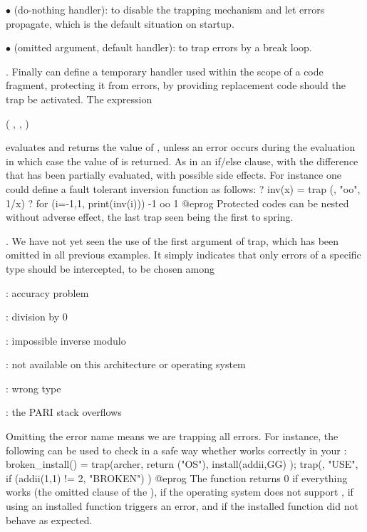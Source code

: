 $\bullet$  (do-nothing handler): to disable the trapping
mechanism and let errors propagate, which is the default situation on
startup.

$\bullet$   (omitted argument, default handler): to trap errors
by a break loop.

. Finally  can define a temporary handler
used within the scope of a code fragment, protecting it from errors, by
providing replacement code should the trap be activated. The expression

  ( , , )

\noindent evaluates and returns the value of , unless an
error occurs during the evaluation in which case the value of 
is returned. As in an if/else clause, with the difference that
 has been partially evaluated, with possible side effects.
For instance one could define a fault tolerant inversion function as follows:
\bprog
? inv(x) = trap (, "oo", 1/x)
? for (i=-1,1, print(inv(i)))
-1
oo
1
@eprog
\noindent Protected codes can be nested without adverse effect, the last trap
seen being the first to spring.

. We have not yet seen the use of the
first argument of trap, which has been omitted in all previous examples. It
simply indicates that only errors of a specific type should be intercepted,
to be chosen among

: accuracy problem

: division by 0

: impossible inverse modulo

: not available on this architecture or operating system

: wrong type

: the PARI stack overflows

\noindent Omitting the error name means we are trapping all errors. For
instance, the following can be used to check in a safe way whether
 works correctly in your :
\bprog
broken_install() =
{
  trap(archer, return ("OS"),
    install(addii,GG)
  );
  trap(, "USE",
    if (addii(1,1) != 2, "BROKEN")
  )
}
@eprog
\noindent The function returns 0 if everything works (the omitted 
clause of the ),  if the operating system does not support
,  if using an installed function triggers an error,
and  if the installed function did not behave as expected.

